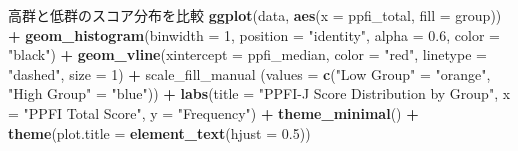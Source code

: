 \documentclass[12pt,a4paper,xelatex,ja=standard]{bxjsarticle}
\newenvironment{Shaded}{\begin{snugshade}}{\end{snugshade}}
\newcommand{\AttributeTok}[1]{\textcolor[rgb]{0.13,0.29,0.53}{#1}}
\newcommand{\DecValTok}[1]{\textcolor[rgb]{0.00,0.00,0.81}{#1}}
\newcommand{\FloatTok}[1]{\textcolor[rgb]{0.00,0.00,0.81}{#1}}
\newcommand{\FunctionTok}[1]{\textcolor[rgb]{0.13,0.29,0.53}{\textbf{#1}}}
\newcommand{\NormalTok}[1]{#1}
\newcommand{\OtherTok}[1]{\textcolor[rgb]{0.56,0.35,0.01}{#1}}
\newcommand{\SpecialCharTok}[1]{\textcolor[rgb]{0.81,0.36,0.00}{\textbf{#1}}}
\newcommand{\StringTok}[1]{\textcolor[rgb]{0.31,0.60,0.02}{#1}}
\begin{document}
\begin{Shaded}
\begin{Highlighting}[]
\NormalTok{高群と低群のスコア分布を比較}
\FunctionTok{ggplot}\NormalTok{(data, }\FunctionTok{aes}\NormalTok{(}\AttributeTok{x =}\NormalTok{ ppfi\_total, }\AttributeTok{fill =}\NormalTok{ group)) }\SpecialCharTok{+}
  \FunctionTok{geom\_histogram}\NormalTok{(}\AttributeTok{binwidth =} \DecValTok{1}\NormalTok{, }
                 \AttributeTok{position =} \StringTok{"identity"}\NormalTok{,}
                 \AttributeTok{alpha =} \FloatTok{0.6}\NormalTok{, }
                 \AttributeTok{color =} \StringTok{"black"}\NormalTok{) }\SpecialCharTok{+}
  \FunctionTok{geom\_vline}\NormalTok{(}\AttributeTok{xintercept =}\NormalTok{ ppfi\_median,}
             \AttributeTok{color =} \StringTok{"red"}\NormalTok{, }
             \AttributeTok{linetype =} \StringTok{"dashed"}\NormalTok{, }\AttributeTok{size =} \DecValTok{1}\NormalTok{) }\SpecialCharTok{+}
\NormalTok{  scale\_fill\_manual}
\NormalTok{(}\AttributeTok{values =} \FunctionTok{c}\NormalTok{(}\StringTok{"Low Group"} \OtherTok{=} \StringTok{"orange"}\NormalTok{, }\StringTok{"High Group"} \OtherTok{=} \StringTok{"blue"}\NormalTok{)) }\SpecialCharTok{+}
  \FunctionTok{labs}\NormalTok{(}\AttributeTok{title =} \StringTok{"PPFI{-}J Score Distribution by Group"}\NormalTok{,}
       \AttributeTok{x =} \StringTok{"PPFI Total Score"}\NormalTok{, }
       \AttributeTok{y =} \StringTok{"Frequency"}\NormalTok{) }\SpecialCharTok{+}
  \FunctionTok{theme\_minimal}\NormalTok{() }\SpecialCharTok{+}
  \FunctionTok{theme}\NormalTok{(}\AttributeTok{plot.title =} \FunctionTok{element\_text}\NormalTok{(}\AttributeTok{hjust =} \FloatTok{0.5}\NormalTok{))}
\end{Highlighting}
\end{Shaded}

\clearpage
\end{document}
